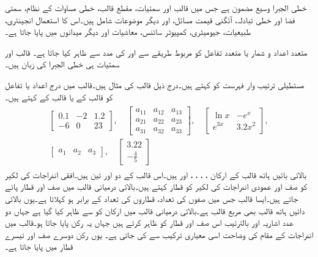 خطی الجبرا وسیع مضمون ہے جس میں قالب اور سمتیات، مقطع قالب، خطی مساوات کے نظام، سمتی فضا اور  خطی تبادلہ، آئگنی قیمت مسائل، اور دیگر موضوعات شامل ہیں۔اس کا استعمال انجینئری، طبیعیات، جیومیٹری، کمپیوٹر سائنس، معاشیات اور دیگر میدانوں میں پایا جاتا ہے۔

متعدد اعداد و شمار یا متعدد تفاعل کو مربوط طریقے سے  اور  کی مدد سے ظاہر کیا جاتا ہے۔ قالب اور سمتیات ہی خطی الجبرا کی زبان ہیں۔



مستطیلی ترتیب وار فہرست کو  کہتے ہیں۔درج ذیل قالب کی مثال ہیں۔قالب میں درج اعداد یا تفاعل کو قالب کے  یا قالب کے  کہتے ہیں۔ 
\begin{gather}
\begin{aligned}\label{مساوات_قالب_عمومی_قالب_الف}
\begin{bmatrix}
0.1& -2 & 1.2\\
-6 & 0 & 23
\end{bmatrix}, \quad
\begin{bmatrix}
a_{11}& a_{12} & a_{13}\\
a_{21} & a_{22} & a_{23}\\
a_{31} & a_{32} & a_{33}
\end{bmatrix}, \quad
\begin{bmatrix}
\ln x& -e^x\\
e^{3x}& 3.2x^2
\end{bmatrix},\\
\begin{bmatrix}
a_{1} & a_{2} & a_{3}
\end{bmatrix},\quad 
\begin{bmatrix}
3.22\\
-\tfrac{4}{5}
\end{bmatrix}
\end{aligned}
\end{gather}
بالائی بائیں ہاتھ قالب کے ارکان ، ، ، ،  اور  ہیں۔اس قالب کے دو  اور تین  ہیں۔افقی اندراجات کی لکیر کو صف اور عمودی اندراجات کی لکیر کو قطار کہتے ہیں۔بالائی درمیانی قالب میں  صف اور  قطار پائے جاتے ہیں۔ایسا قالب جس میں صفوں کی تعداد، قطاروں کی تعداد کے برابر ہو   کہلاتا ہے۔یوں بالائی دائیں ہاتھ قالب بھی مربع قالب ہے۔بالائی درمیانی قالب میں ارکان کو  سے ظاہر کیا گیا ہے جہاں دو عدد اشاریہ  اور  بالترتیب اس صف اور قطار کو ظاہر کرتے ہیں جہاں یہ رکن پایا جاتا ہو۔قالب میں اندراجات کے مقام کی وضاحت اسی معیاری ترکیب سے کی جاتی ہے۔ یوں  رکن دوسرے صف اور تیسرے قطار میں پایا جاتا ہے۔

